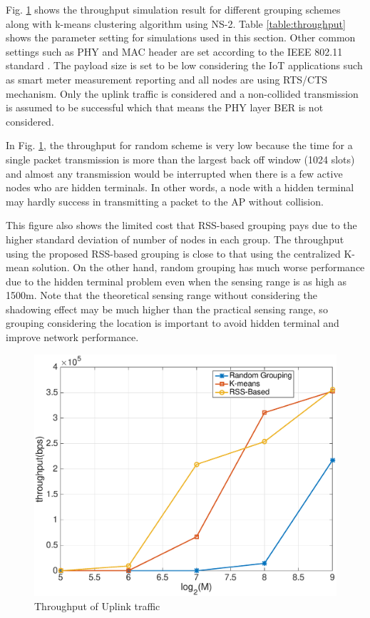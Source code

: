 Fig. \ref{fig:throughput} shows the throughput simulation result for different grouping schemes along with k-means clustering algorithm using NS-2. Table \ref{table:throughput} shows the parameter setting for simulations used in this section. Other common settings such as PHY and MAC header are set according to the IEEE 802.11 standard \cite{wlan2011}. The payload size is set to be low considering the IoT applications such as smart meter measurement reporting and all nodes are using RTS/CTS mechanism. Only the uplink traffic is considered and a non-collided transmission is assumed to be successful which that means the PHY layer BER is not considered. 

 In Fig. \ref{fig:throughput}, the throughput for random scheme is very low because the time for a single packet transmission is more than the largest back off window (1024 slots) and almost any transmission would be interrupted when there is a few active nodes who are hidden terminals. In other words, a node with a hidden terminal may hardly success in transmitting a packet to the AP without collision.

This figure also shows the limited cost that RSS-based grouping pays due to the higher standard deviation of number of nodes in each group. The throughput using the proposed RSS-based grouping is close to that using the centralized K-mean solution. On the other hand, random grouping has much worse performance due to the hidden terminal problem even when the sensing range is as high as 1500m. Note that the theoretical sensing range without considering the shadowing effect may be much higher than the practical sensing range, so grouping considering the location is important to avoid hidden terminal and improve network performance.
\begin{figure} [!tbp]
  \centering
  \includegraphics[width=.95\textwidth]{figures/throughput}
  \caption{Throughput of Uplink traffic}
  \label{fig:throughput}
\end{figure}



